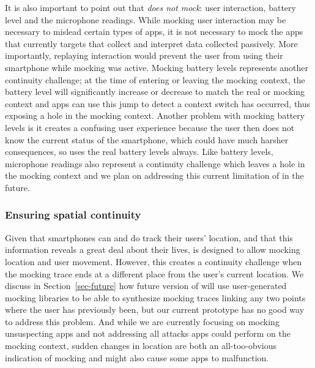 It is also important to point out that \PocketMocker{} \textit{does
not mock}: user interaction, battery level and the microphone
readings. While mocking user interaction may be necessary to mislead certain
types of apps, it is not necessary to mock the apps that \PocketMocker{}
currently targets that collect and interpret data collected passively. More
importantly, replaying interaction would prevent the user from using their
smartphone while mocking was active. Mocking battery levels represents another
continuity challenge; at the time of entering or leaving the mocking context,
the battery level will significantly increase or decrease to match the real or
mocking context and apps can use this jump to detect a context switch has
occurred, thus exposing a hole in the mocking context. Another problem with
mocking battery levels is it creates a confusing user experience because the
user then does not know the current status of the smartphone, which could have
much harsher consequences, so \PocketMocker{} uses the real battery levels
always. Like battery levels, microphone readings also represent a continuity
challenge which leaves a hole in the mocking context and we plan on addressing
this current limitation of \PocketMocker{} in the future.

\subsubsection{Ensuring spatial continuity}

Given that smartphones can and do track their users' location, and that this
information reveals a great deal about their lives, \PocketMocker{} is
designed to allow mocking location and user movement. However, this creates a
continuity challenge when the mocking trace ends at a different place from
the user's current location. We discuss in Section~\ref{sec-future} how
future version of \PocketMocker{} will use user-generated mocking libraries
to be able to synthesize mocking traces linking any two points where the user
has previously been, but our current prototype has no good way to address
this problem. And while we are currently focusing on mocking unsuspecting
apps and not addressing all attacks apps could perform on the mocking
context, sudden changes in location are both an all-too-obvious indication of
mocking and might also cause some apps to malfunction.

